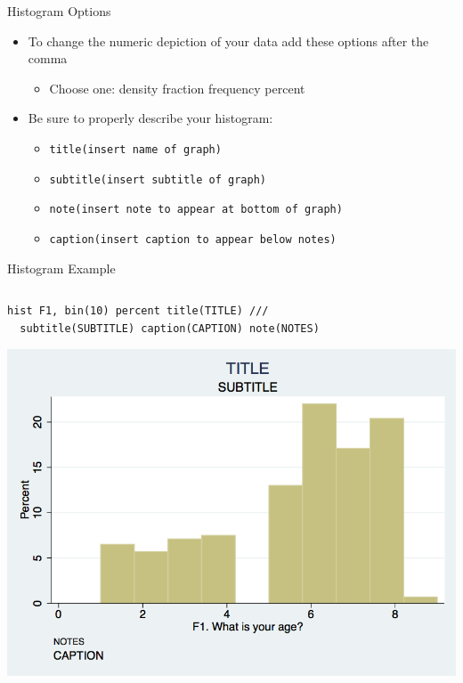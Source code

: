 \documentclass[table,smaller]{beamer}
\begin{document}
\begin{frame}[fragile,label=sec-2-3]{Histogram Options}
 \begin{itemize}
\item To change the numeric depiction of your data add these options after the comma 
\begin{itemize}
\item Choose one: density fraction frequency percent
\end{itemize}
\item Be sure to properly describe your histogram:
\begin{itemize}
\item \texttt{title(insert name of graph)}
\item \texttt{subtitle(insert subtitle of graph)}
\item \texttt{note(insert note to appear at bottom of graph)}
\item \texttt{caption(insert caption to appear below notes)}
\end{itemize}
\end{itemize}
\end{frame}
\begin{frame}[fragile,label=sec-2-4]{Histogram Example}
 \vspace{-.5em} \begin{columns}  \begin{block}{}
\begin{verbatim}
hist F1, bin(10) percent title(TITLE) ///
  subtitle(SUBTITLE) caption(CAPTION) note(NOTES)
\end{verbatim}

\vspace{-1.5em}

\includegraphics[width=.9\linewidth]{./images/hist1.png}

\end{block} \end{columns}
\end{frame}
\end{document}
